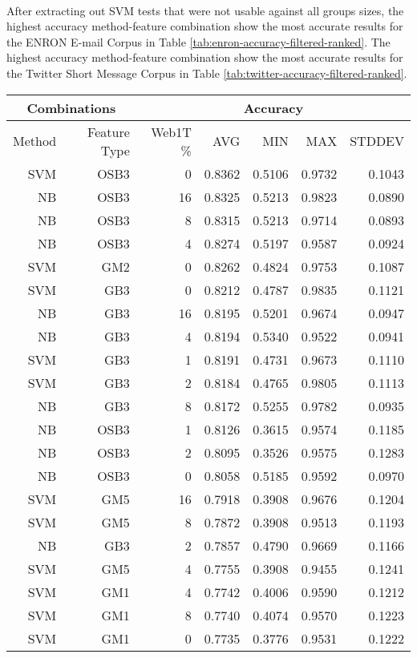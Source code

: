	\paragraph*{} After extracting out SVM tests that were not usable against all groups sizes, the highest accuracy method-feature combination show the most accurate results for the ENRON E-mail Corpus in Table \ref{tab:enron-accuracy-filtered-ranked}.  The highest accuracy method-feature combination show the most accurate results for the Twitter Short Message Corpus in Table \ref{tab:twitter-accuracy-filtered-ranked}.
	
	
	\begin{table}[htbp!]
			\begin{center}
			\begin{tabular}{ | r | r | r | r | r | r | r | }
			\hline
			\multicolumn{2}{|c|}{Combinations} & \multicolumn{5}{|c|}{Accuracy}\\
			\hline
			Method & Feature Type & Web1T \% & AVG & MIN & MAX & STDDEV\\ \hline 
			SVM & OSB3 & 0 & 0.8362 & 0.5106 & 0.9732 & 0.1043\\ \hline 
			NB & OSB3 & 16 & 0.8325 & 0.5213 & 0.9823 & 0.0890\\ \hline 
			NB & OSB3 & 8 & 0.8315 & 0.5213 & 0.9714 & 0.0893\\ \hline 
			NB & OSB3 & 4 & 0.8274 & 0.5197 & 0.9587 & 0.0924\\ \hline 
			SVM & GM2 & 0 & 0.8262 & 0.4824 & 0.9753 & 0.1087\\ \hline 
			SVM & GB3 & 0 & 0.8212 & 0.4787 & 0.9835 & 0.1121\\ \hline 
			NB & GB3 & 16 & 0.8195 & 0.5201 & 0.9674 & 0.0947\\ \hline 
			NB & GB3 & 4 & 0.8194 & 0.5340 & 0.9522 & 0.0941\\ \hline 
			SVM & GB3 & 1 & 0.8191 & 0.4731 & 0.9673 & 0.1110\\ \hline 
			SVM & GB3 & 2 & 0.8184 & 0.4765 & 0.9805 & 0.1113\\ \hline 
			NB & GB3 & 8 & 0.8172 & 0.5255 & 0.9782 & 0.0935\\ \hline 
			NB & OSB3 & 1 & 0.8126 & 0.3615 & 0.9574 & 0.1185\\ \hline 
			NB & OSB3 & 2 & 0.8095 & 0.3526 & 0.9575 & 0.1283\\ \hline 
			NB & OSB3 & 0 & 0.8058 & 0.5185 & 0.9592 & 0.0970\\ \hline 
			SVM & GM5 & 16 & 0.7918 & 0.3908 & 0.9676 & 0.1204\\ \hline 
			SVM & GM5 & 8 & 0.7872 & 0.3908 & 0.9513 & 0.1193\\ \hline 
			NB & GB3 & 2 & 0.7857 & 0.4790 & 0.9669 & 0.1166\\ \hline 
			SVM & GM5 & 4 & 0.7755 & 0.3908 & 0.9455 & 0.1241\\ \hline 
			SVM & GM1 & 4 & 0.7742 & 0.4006 & 0.9590 & 0.1212\\ \hline 
			SVM & GM1 & 8 & 0.7740 & 0.4074 & 0.9570 & 0.1223\\ \hline 
			SVM & GM1 & 0 & 0.7735 & 0.3776 & 0.9531 & 0.1222\\ \hline 


\end{tabular}
\end{center}
\end{table}
